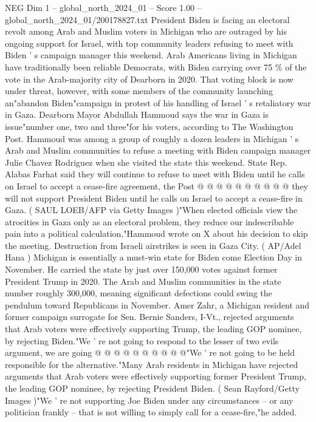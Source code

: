\begin{textsample}{NEG Dim 1 – global\_north\_2024\_01 – Score 1.00 – global\_north\_2024\_01/200178827.txt}  \label{ex:f1_neg_291}
President Biden is facing an electoral revolt among Arab and Muslim voters in Michigan who are outraged by his ongoing support for Israel, with top community leaders refusing to meet with Biden ' s campaign manager this weekend.
Arab Americans living in Michigan have traditionally been reliable Democrats, with Biden carrying over 75 \% of the vote in the Arab-majority city of Dearborn in 2020.
That voting block is now under threat, however, with some members of the community launching an"abandon Biden"campaign in protest of his handling of Israel ' s retaliatory war in Gaza.
Dearborn Mayor Abdullah Hammoud says the war in Gaza is issue"number one, two and three"for his voters, according to The Washington Post.
Hammoud was among a group of roughly a dozen leaders in Michigan ' s Arab and Muslim communities to refuse a meeting with Biden campaign manager Julie Chavez Rodriguez when she visited the state this weekend.
State Rep.
Alabas Farhat said they will continue to refuse to meet with Biden until he calls on Israel to accept a cease-fire agreement, the Post @ @ @ @ @ @ @ @ @ @ they will not support President Biden until he calls on Israel to accept a cease-fire in Gaza. ( SAUL LOEB/AFP via Getty Images )"When elected officials view the atrocities in Gaza only as an electoral problem, they reduce our indescribable pain into a political calculation,"Hammoud wrote on X about his decision to skip the meeting.
Destruction from Israeli airstrikes is seen in Gaza City. ( AP/Adel Hana ) Michigan is essentially a must-win state for Biden come Election Day in November.
He carried the state by just over 150,000 votes against former President Trump in 2020.
The Arab and Muslim communities in the state number roughly 300,000, meaning significant defections could swing the pendulum toward Republicans in November.
Amer Zahr, a Michigan resident and former campaign surrogate for Sen.
Bernie Sanders, I-Vt., rejected arguments that Arab voters were effectively supporting Trump, the leading GOP nominee, by rejecting Biden."We ' re not going to respond to the lesser of two evils argument, we are going @ @ @ @ @ @ @ @ @ @"We ' re not going to be held responsible for the alternative."Many Arab residents in Michigan have rejected arguments that Arab voters were effectively supporting former President Trump, the leading GOP nominee, by rejecting President Biden. ( Sean Rayford/Getty Images )"We ' re not supporting Joe Biden under any circumstances -- or any politician frankly -- that is not willing to simply call for a cease-fire,"he added.

\end{textsample}

